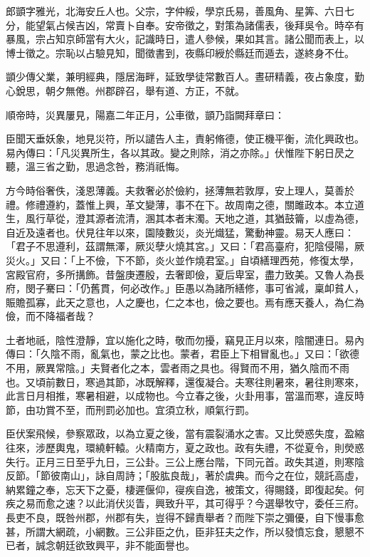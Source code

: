 
\begin{pinyinscope}
郎顗字雅光，北海安丘人也。父宗，字仲綏，學京氏易，善風角、星筭、六日七分，能望氣占候吉凶，常賣卜自奉。安帝徵之，對策為諸儒表，後拜吳令。時卒有暴風，宗占知京師當有大火，記識時日，遣人參候，果如其言。諸公聞而表上，以博士徵之。宗恥以占驗見知，聞徵書到，夜縣印綬於縣廷而遁去，遂終身不仕。

顗少傳父業，兼明經典，隱居海畔，延致學徒常數百人。晝研精義，夜占象度，勤心銳思，朝夕無倦。州郡辟召，舉有道、方正，不就。

順帝時，災異屢見，陽嘉二年正月，公車徵，顗乃詣闕拜章曰：

臣聞天垂妖象，地見災符，所以譴告人主，責躬脩德，使正機平衡，流化興政也。易內傳曰：「凡災異所生，各以其政。變之則除，消之亦除。」伏惟陛下躬日昃之聽，溫三省之勤，思過念咎，務消祇悔。

方今時俗奢佚，淺恩薄義。夫救奢必於儉約，拯薄無若敦厚，安上理人，莫善於禮。修禮遵約，蓋惟上興，革文變薄，事不在下。故周南之德，關雎政本。本立道生，風行草從，澄其源者流清，溷其本者末濁。天地之道，其猶鼓籥，以虛為德，自近及遠者也。伏見往年以來，園陵數災，炎光熾猛，驚動神靈。易天人應曰：「君子不思遵利，茲謂無澤，厥災孽火燒其宮。」又曰：「君高臺府，犯陰侵陽，厥災火。」又曰：「上不儉，下不節，炎火並作燒君室。」自頃繕理西苑，修復太學，宮殿官府，多所搆飾。昔盤庚遷殷，去奢即儉，夏后卑室，盡力致美。又魯人為長府，閔子騫曰：「仍舊貫，何必改作。」臣愚以為諸所繕修，事可省減，稟卹貧人，賑贍孤寡，此天之意也，人之慶也，仁之本也，儉之要也。焉有應天養人，為仁為儉，而不降福者哉？

土者地祇，陰性澄靜，宜以施化之時，敬而勿擾，竊見正月以來，陰闇連日。易內傳曰：「久陰不雨，亂氣也，蒙之比也。蒙者，君臣上下相冒亂也。」又曰：「欲德不用，厥異常陰。」夫賢者化之本，雲者雨之具也。得賢而不用，猶久陰而不雨也。又頃前數日，寒過其節，冰既解釋，還復凝合。夫寒往則暑來，暑往則寒來，此言日月相推，寒暑相避，以成物也。今立春之後，火卦用事，當溫而寒，違反時節，由功賞不至，而刑罰必加也。宜須立秋，順氣行罰。

臣伏案飛候，參察眾政，以為立夏之後，當有震裂涌水之害。又比熒惑失度，盈縮往來，涉歷輿鬼，環繞軒轅。火精南方，夏之政也。政有失禮，不從夏令，則熒惑失行。正月三日至乎九日，三公卦。三公上應台階，下同元首。政失其道，則寒陰反節。「節彼南山」，詠自周詩；「股肱良哉」，著於虞典。而今之在位，競託高虛，納累鐘之奉，忘天下之憂，棲遲偃仰，寑疾自逸，被策文，得賜錢，即復起矣。何疾之易而愈之速？以此消伏災眚，興致升平，其可得乎？今選舉牧守，委任三府。長吏不良，既咎州郡，州郡有失，豈得不歸責舉者？而陛下崇之彌優，自下慢事愈甚，所謂大網疏，小網數。三公非臣之仇，臣非狂夫之作，所以發憤忘食，懇懇不已者，誠念朝廷欲致興平，非不能面譽也。


\end{pinyinscope}
